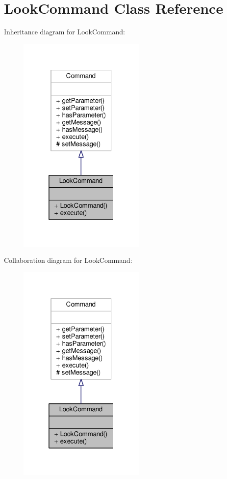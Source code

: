 \hypertarget{classLookCommand}{\section{Look\-Command Class Reference}
\label{classLookCommand}
}


Inheritance diagram for Look\-Command\-:
\nopagebreak
\begin{figure}[H]
\begin{center}
\leavevmode
\includegraphics[width=176pt]{classLookCommand__inherit__graph}
\end{center}
\end{figure}


Collaboration diagram for Look\-Command\-:
\nopagebreak
\begin{figure}[H]
\begin{center}
\leavevmode
\includegraphics[width=176pt]{classLookCommand__coll__graph}
\end{center}
\end{figure}
